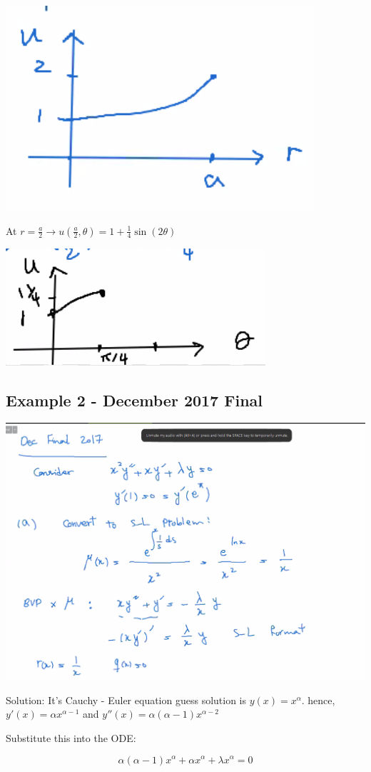 \documentclass{article}
\begin{document}
\includegraphics[width = 0.5 \textwidth]{3.png}

At $r = \frac{a}{2} \longrightarrow u(\frac{a}{2}, \theta) = 1 + \frac{1}{4} \sin(2 \theta)$

\includegraphics[width = 0.5 \textwidth]{6.png}

\subsection{Example 2 - December 2017 Final}

\includegraphics[width = 0.95 \textwidth]{4.png}

Solution: It's Cauchy - Euler equation guess solution is $y(x) = x^\alpha$. hence, $y'(x) = \alpha x^{\alpha - 1}$ and $y''(x) = \alpha (\alpha - 1) x^{\alpha - 2}$

Substitute this into the ODE:

$$\alpha (\alpha - 1) x^\alpha + \alpha x^{\alpha} + \lambda x^{\alpha} = 0$$
\end{document}
